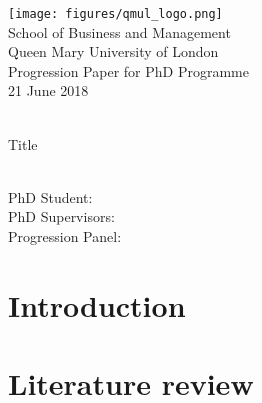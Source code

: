 \documentclass[11pt]{article}
\begin{document}
\begin{titlepage}            
    \begin{flushleft}{
        \texttt{[image: figures/qmul\_logo.png]}\\
        School of Business and Management\\
        Queen Mary University of London\\[1cm]
        Progression Paper for PhD Programme\\
        21 June 2018\\[2cm]
    }\end{flushleft}
    \centering
    \HRule \\[1cm]
    {\huge Title}\\[1cm]
    \HRule \\[1cm]

    \begin{flushleft}{
        PhD Student: \\
        PhD Supervisors: \\
        Progression Panel: \\[1cm]
    }\end{flushleft}
\end{titlepage}


\section{Introduction\label{sec:introduction}}

\section{Literature review\label{sec:literature_review}}

\end{document}
